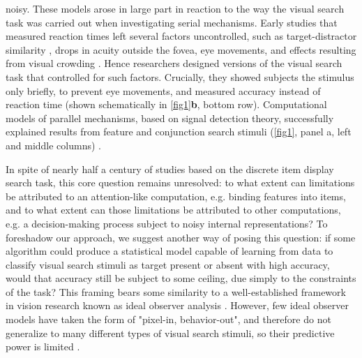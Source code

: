 \documentclass[10pt,letterpaper]{article}
\begin{document}
noisy. These models arose in large part in reaction 
to the way the visual search task was carried out when investigating
serial mechanisms. Early studies that measured reaction times left several factors 
uncontrolled, such as target-distractor similarity \cite{duncanVisualSearchStimulus1989}, 
drops in acuity outside the fovea, eye movements, and effects resulting from visual 
crowding \cite{bergenRapidDiscriminationVisual1983,ecksteinLowerVisualSearch1998a}. 
Hence researchers designed versions of the visual search task that controlled for such 
factors. Crucially, they showed subjects the 
stimulus only briefly, to prevent eye movements, and measured accuracy instead of reaction
time (shown schematically in \ref{fig1}\textbf{b}, bottom row). 
Computational models of parallel mechanisms, based on signal detection theory, 
successfully explained results from feature and conjunction search stimuli 
(\ref{fig1}, panel a, left and middle columns) 
\cite{palmerPsychophysicsVisualSearch2000,ecksteinVisualSearchRetrospective2011}.

In spite of nearly half a century of studies based on the discrete item display search task,
this core question remains unresolved: to what extent can limitations be attributed to an attention-like 
computation, e.g. binding features into items, and to what extent can those limitations be 
attributed to other computations, e.g. a decision-making process subject to noisy internal representations?
To foreshadow our approach, we suggest another way of posing this question: 
if some algorithm could produce a statistical model capable of learning from data 
to classify visual search stimuli as target present or absent with high 
accuracy, would that accuracy still be subject to some ceiling, due simply to the 
constraints of the task? This framing bears some similarity to a 
well-established framework in vision research known as ideal observer analysis 
\cite{geislerIdealObserverAnalysis2003}. However, few ideal observer models have taken the 
form of "pixel-in, behavior-out", and therefore do not generalize to many 
different types of visual search stimuli, so their predictive power is limited 
\cite{geislerModelsOvertAttention2011}.
\end{document}

